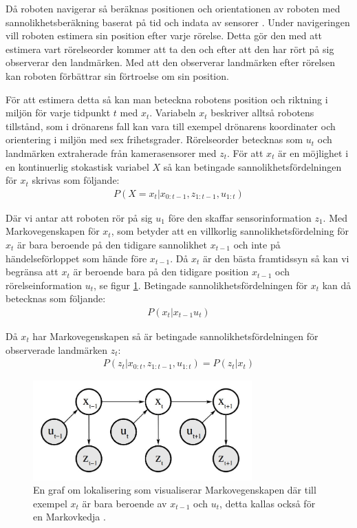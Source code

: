Då roboten navigerar så beräknas positionen och orientationen av roboten med sannolikhetsberäkning baserat på tid och indata av sensorer \citep{ProbabilisticRobotics}. Under navigeringen vill roboten estimera sin position efter varje rörelse. Detta gör den med att estimera vart rörelseorder kommer att ta den och efter att den har rört på sig observerar den landmärken. Med att den observerar landmärken efter rörelsen kan roboten förbättrar sin förtroelse om sin position. 

För att estimera detta så kan man beteckna robotens position och riktning i miljön för varje tidpunkt $t$ med $x_t$. Variabeln $x_t$ beskriver alltså robotens tillstånd, som i drönarens fall kan vara till exempel drönarens koordinater och orientering i miljön med sex frihetsgrader. Rörelseorder betecknas som $u_t$ och landmärken extraherade från kamerasensorer med $z_t$. För att $x_t$ är en möjlighet i en kontinuerlig stokastisk variabel $X$ så kan betingade sannolikhetsfördelningen för $x_t$ skrivas som följande:
\begin{align}
    P( X = x_t | x_{0:t-1}, z_{1:t-1}, u_{1:t})
\end{align}

Där vi antar att roboten rör på sig $u_1$ före den skaffar sensorinformation $z_1$. Med Markovegenskapen för $x_t$, som betyder att en villkorlig sannolikhetsfördelning för $x_t$ är bara beroende på den tidigare sannolikhet $x_{t-1}$ och inte på händelseförloppet som hände före $x_{t-1}$. Då $x_t$ är den bästa framtidssyn så kan vi begränsa att $x_t$ är beroende bara på den tidigare position $x_{t-1}$ och rörelseinformation $u_t$, se figur \ref{markov}. Betingade sannolikhetsfördelningen för $x_t$ kan då betecknas som följande:
\begin{align}
    P(x_t | x_{t-1} u_{t})
\end{align}

Då $x_t$ har Markovegenskapen så är betingade sannolikhetsfördelningen för observerade landmärken $z_t$:
\begin{align}
    P(z_t | x_{0:t}, z_{1:t-1}, u_{1:t}) = P(z_t|x_t)
\end{align}

\begin{figure}[ht]
    \begin{center}
    \includegraphics[width=0.75\textwidth]{markov.JPG}
    \caption{En graf om lokalisering som visualiserar Markovegenskapen där till exempel $x_t$ är bara beroende av $x_{t-1}$ och $u_t$, detta kallas också för en Markovkedja \citep{ProbabilisticRobotics}.}
    \label{markov}
    \end{center}
\end{figure}

